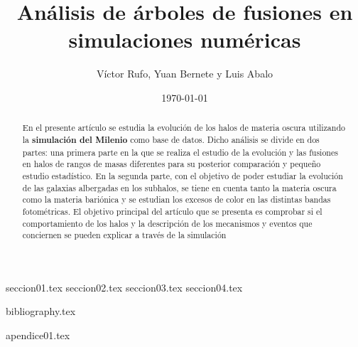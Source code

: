 \documentclass[a4paper, amsfonts, amssymb, amsmath, reprint, showkeys, nofootinbib, twoside]{revtex4-1}
\begin{document}
\renewcommand{\tablename}{\textit{Tabla}}
\renewcommand{\figurename}{\textit{Figura}}

\title{Análisis de árboles de fusiones en simulaciones numéricas}

\author{Víctor Rufo, Yuan Bernete y Luis Abalo}

\date{\today} %

\begin{abstract}
En el presente artículo se estudia la evolución de los halos de materia oscura utilizando la \textbf{simulación del Milenio} como base de datos. Dicho análisis se divide en dos partes: una primera parte en la que se realiza el estudio de la evolución y las fusiones en halos de rangos de masas diferentes para su posterior comparación y pequeño estudio estadístico. En la segunda parte, con el objetivo de poder estudiar la evolución de las galaxias albergadas en los subhalos, se tiene en cuenta tanto la materia oscura como la materia bariónica y se estudian los excesos de color en las distintas bandas fotométricas. El objetivo principal del artículo que se presenta es comprobar si el comportamiento de los halos y la descripción de los mecanismos y eventos que conciernen se pueden explicar a través de la simulación

\end{abstract}


\maketitle


{seccion01.tex} 
{seccion02.tex}
{seccion03.tex}
{seccion04.tex}

{bibliography.tex}

{apendice01.tex}
\end{document}
